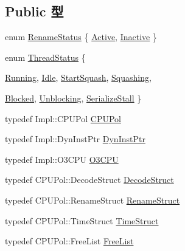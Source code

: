 \subsection*{Public 型}
\begin{DoxyCompactItemize}
\item 
enum \hyperlink{classDefaultRename_ac9f77d94a52c9029448b6d7b61d32718}{RenameStatus} \{ \hyperlink{classDefaultRename_ac9f77d94a52c9029448b6d7b61d32718a26bd8444261cc58df7a86753c79d2520}{Active}, 
\hyperlink{classDefaultRename_ac9f77d94a52c9029448b6d7b61d32718a969c924a722daf6334fca64346092ae6}{Inactive}
 \}
\item 
enum \hyperlink{classDefaultRename_ae2739961013a00cede621d4d72f2173c}{ThreadStatus} \{ \par
\hyperlink{classDefaultRename_ae2739961013a00cede621d4d72f2173ca2f5f2c4a8c4f4f0519d503dcdfbf55cb}{Running}, 
\hyperlink{classDefaultRename_ae2739961013a00cede621d4d72f2173cad3fa9ae9431d6cb1772f9d9df48cab19}{Idle}, 
\hyperlink{classDefaultRename_ae2739961013a00cede621d4d72f2173ca19a48e232b72697e4bb7ea1b6075ed49}{StartSquash}, 
\hyperlink{classDefaultRename_ae2739961013a00cede621d4d72f2173ca22a648855197e326dc88f548634c0ec7}{Squashing}, 
\par
\hyperlink{classDefaultRename_ae2739961013a00cede621d4d72f2173ca9463ee9b8700258a1019b4b9d2d77a30}{Blocked}, 
\hyperlink{classDefaultRename_ae2739961013a00cede621d4d72f2173caf2a3acf850890cb1651bc41dcbacb7e0}{Unblocking}, 
\hyperlink{classDefaultRename_ae2739961013a00cede621d4d72f2173caca0d28c09e2dcdb3aec968eda81d65f3}{SerializeStall}
 \}
\item 
typedef Impl::CPUPol \hyperlink{classDefaultRename_a87d662eaeb9eab249d671b63cb4ba11a}{CPUPol}
\item 
typedef Impl::DynInstPtr \hyperlink{classDefaultRename_a028ce10889c5f6450239d9e9a7347976}{DynInstPtr}
\item 
typedef Impl::O3CPU \hyperlink{classDefaultRename_a44622cf06940413482836cb62931ac3f}{O3CPU}
\item 
typedef CPUPol::DecodeStruct \hyperlink{classDefaultRename_a38077cd156cf219016abf92d8c5b523b}{DecodeStruct}
\item 
typedef CPUPol::RenameStruct \hyperlink{classDefaultRename_a0c2a89ad2edad9ad605d0461f9b132a5}{RenameStruct}
\item 
typedef CPUPol::TimeStruct \hyperlink{classDefaultRename_ab7dd3632ef639702a5c6e7c2c3a2f82a}{TimeStruct}
\item 
typedef CPUPol::FreeList \hyperlink{classDefaultRename_ab784c356bacd490590fba42443e0f786}{FreeList}

\end{DoxyCompactItemize}
